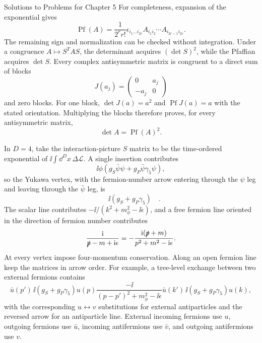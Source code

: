 \begin{bankssolutions}{Solutions to Problems for Chapter 5}
For completeness, expansion of the exponential gives
\begin{equation*}
 \operatorname{Pf}(A)=\frac1{2^r r!}
 \epsilon_{i_1\ldots i_{2r}}
 A_{i_1i_2}\cdots A_{i_{2r-1}i_{2r}}.
\end{equation*}
The remaining sign and normalization can be checked without integration. Under a
congruence $A\mapsto S^TAS$, the determinant acquires $(\det S)^2$, while the
Pfaffian acquires $\det S$. Every complex antisymmetric matrix is congruent to a
direct sum of blocks
\begin{equation*}
 J(a_j)=\begin{pmatrix}0&a_j\\-a_j&0\end{pmatrix}
\end{equation*}
and zero blocks. For one block, $\det J(a)=a^2$ and
$\operatorname{Pf}J(a)=a$ with the stated orientation. Multiplying the blocks
therefore proves, for every antisymmetric matrix,
\begin{equation*}
 \boxed{\det A=\operatorname{Pf}(A)^2}.
\end{equation*}

In $D=4$, take the interaction-picture $S$ matrix to be the time-ordered exponential
of $\ii\int\dd^D x\,\Delta\mathcal L$. A single insertion contributes
\begin{equation*}
 \ii\phi\left(g_S\bar\psi\psi+g_P\bar\psi\gamma_5\psi\right),
\end{equation*}
so the Yukawa vertex, with the fermion-number arrow entering through the
$\psi$ leg and leaving through the $\bar\psi$ leg, is
\begin{equation*}
 \boxed{\quad \ii\left(g_S+g_P\gamma_5\right)\quad}.
\end{equation*}
The scalar line contributes
$-\ii/(k^2+m_\phi^2-\ii\epsilon)$, and a free fermion line oriented in the
direction of fermion number contributes
\begin{equation*}
 \frac{\mathrm{i}}{\slashed p-m+\mathrm{i}\epsilon}
 =-\frac{\mathrm{i}(\slashed p+m)}{p^2+m^2-\mathrm{i}\epsilon}.
\end{equation*}
At every vertex impose four-momentum conservation. Along an open fermion line
keep the matrices in arrow order. For example, a tree-level exchange between
two external fermions contains
\begin{equation*}
 \bar u(p')\,\ii(g_S+g_P\gamma_5)u(p)
 \frac{-\ii}{(p-p')^2+m_\phi^2-\ii\epsilon}
 \bar u(k')\,\ii(g_S+g_P\gamma_5)u(k),
\end{equation*}
with the corresponding $u\leftrightarrow v$ substitutions for external
antiparticles and the reversed arrow for an antiparticle line. External incoming
fermions use $u$, outgoing fermions use $\bar u$, incoming antifermions use
$\bar v$, and outgoing antifermions use $v$.


\end{bankssolutions}
